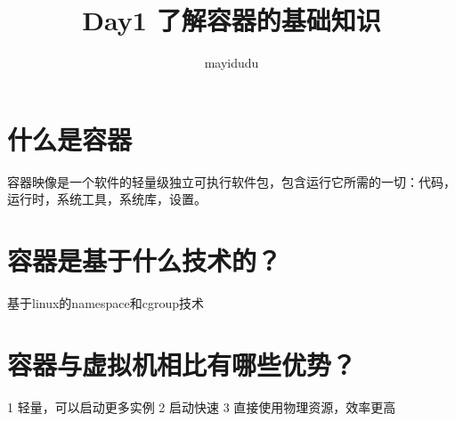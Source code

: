 \documentclass{ctexart}
\begin{document}
\title{Day1 了解容器的基础知识}
\author{mayidudu}
\maketitle


\section{什么是容器}
容器映像是一个软件的轻量级独立可执行软件包，包含运行它所需的一切：代码，运行时，系统工具，系统库，设置。

\section{ 容器是基于什么技术的？}
基于linux的namespace和cgroup技术

\section{ 容器与虚拟机相比有哪些优势？}
1 轻量，可以启动更多实例
2 启动快速
3 直接使用物理资源，效率更高
\end{document}
